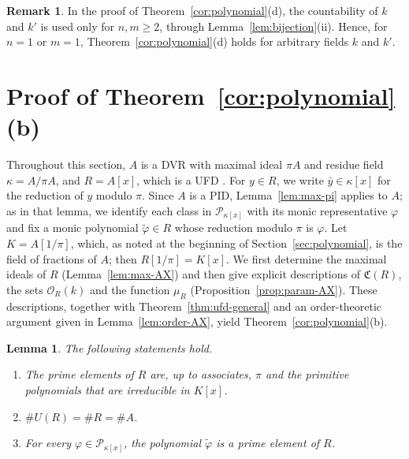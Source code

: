 \documentclass[12pt,reqno,a4paper]{amsart}
\newcommand{\Pe}{\mathcal{P}}
\theoremstyle{plain}
\newtheorem{lemma}[theorem]{Lemma}
\theoremstyle{definition}
\newtheorem{remark}[theorem]{Remark}
\begin{document}
\begin{remark}\label{rem:poly-arbitrary}
In the proof of Theorem~\ref{cor:polynomial}(d), the countability of $k$ and $k'$ is used only for $n,m\geq2$, through Lemma~\ref{lem:bijection}(ii). Hence, for $n=1$ or $m=1$, Theorem~\ref{cor:polynomial}(d) holds for arbitrary fields $k$ and $k'$.
\end{remark}
\section{Proof of \texorpdfstring{Theorem~\ref{cor:polynomial}(b)}{}}\label{sec:proof-b}
Throughout this section, $A$ is a DVR with maximal ideal $\pi A$ and residue field $\kappa=A/\pi A$, and $R=A[x]$, which is a UFD \cite[Section~9.3, Theorem~7]{DummitFoote}. For $y\in R$, we write $\bar y\in\kappa[x]$ for the reduction of $y$ modulo $\pi$. Since $A$ is a PID, Lemma~\ref{lem:max-pi} applies to $A$; as in that lemma, we identify each class in $\Pe_{\kappa[x]}$ with its monic representative $\varphi$ and fix a monic polynomial $\tilde\varphi\in R$ whose reduction modulo $\pi$ is $\varphi$. Let $K=A[1/\pi]$, which, as noted at the beginning of Section~\ref{sec:polynomial}, is the field of fractions of $A$; then $R[1/\pi]=K[x]$. We first determine the maximal ideals of $R$ (Lemma~\ref{lem:max-AX}) and then give explicit descriptions of $\mathfrak{C}(R)$, the sets $\mathcal{O}_R(k)$ and the function $\mu_R$ (Proposition~\ref{prop:param-AX}). These descriptions, together with Theorem~\ref{thm:ufd-general} and an order-theoretic argument given in Lemma~\ref{lem:order-AX}, yield Theorem~\ref{cor:polynomial}(b).
\begin{lemma}\label{lem:arith-AX}
The following statements hold. 
\begin{enumerate}[label=\textup{(\roman*)}]
\item The prime elements of $R$ are, up to associates, $\pi$ and the primitive polynomials that are irreducible in $K[x]$.
\item $\#U(R)=\#R=\#A$.
\item For every $\varphi\in\Pe_{\kappa[x]}$, the polynomial $\tilde\varphi$ is a prime element of $R$.
\end{enumerate}
\end{lemma}
\end{document}
